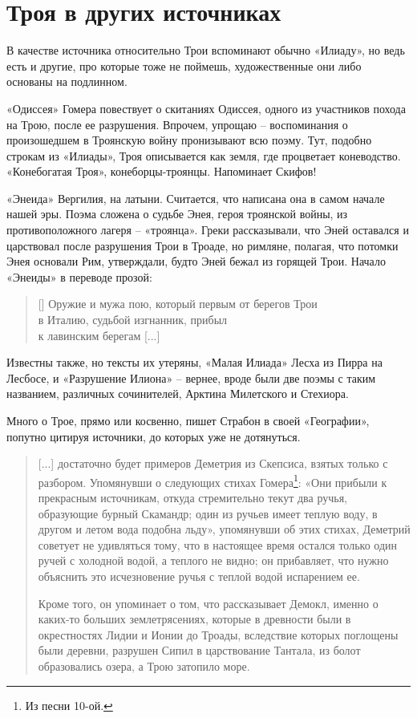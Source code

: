 \chapter{Троя в других источниках}

В качестве источника относительно Трои вспоминают обычно «Илиаду», но ведь есть и другие, про которые тоже не поймешь, художественные они либо основаны на подлинном.

«Одиссея» Гомера повествует о скитаниях Одиссея, одного из участников похода на Трою, после ее разрушения. Впрочем, упрощаю – воспоминания о произошедшем в Троянскую войну пронизывают всю поэму. Тут, подобно строкам из «Илиады», Троя описывается как земля, где процветает коневодство. «Конебогатая Троя», конеборцы-троянцы. Напоминает Скифов!

«Энеида» Вергилия, на латыни. Считается, что написана она в самом начале нашей эры. Поэма сложена о судьбе Энея, героя троянской войны, из противоположного лагеря – «троянца». Греки рассказывали, что Эней оставался и царствовал после разрушения Трои в Троаде, но римляне, полагая, что потомки Энея основали Рим, утверждали, будто Эней бежал из горящей Трои. Начало «Энеиды» в переводе прозой:

\settowidth{\versewidth}{Оружие и мужа пою, который первым от берегов Трои} 
\begin{verse}[\versewidth]
Оружие и мужа пою, который первым от берегов Трои\\
в Италию, судьбой изгнанник, прибыл\\ к лавинским берегам [...]
\end{verse}

Известны также, но тексты их утеряны, «Малая Илиада» Лесха из Пирра на Лесбосе, и «Разрушение Илиона» – вернее, вроде были две поэмы с таким названием, различных сочинителей, Арктина Милетского и Стехиора.

Много о Трое, прямо или косвенно, пишет Страбон в своей «Географии», попутно цитируя источники, до которых уже не дотянуться.

\begin{quotation}
[...] достаточно будет примеров Деметрия из Скепсиса, взятых только с разбором. Упомянувши о следующих стихах Гомера\footnote{Из песни 10-ой.}: «Они прибыли к прекрасным источникам, откуда стремительно текут два ручья, образующие бурный Скамандр; один из ручьев имеет теплую воду, в другом и летом вода подобна льду», упомянувши об этих стихах, Деметрий советует не удивляться тому, что в настоящее время остался только один ручей с холодной водой, а теплого не видно; он прибавляет, что нужно объяснить это исчезновение ручья с теплой водой испарением ее.

Кроме того, он упоминает о том, что рассказывает Демокл, именно о каких-то больших землетрясениях, которые в древности были в окрестностях Лидии и Ионии до Троады, вследствие которых поглощены были деревни, разрушен Сипил в царствование Тантала, из болот образовались озера, а Трою затопило море.
\end{quotation}

